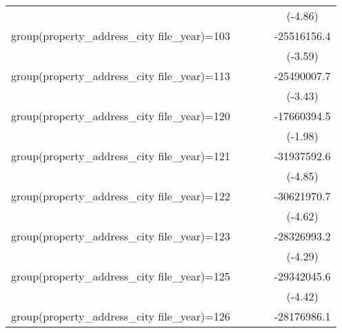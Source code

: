 {\begin{tabular}{l*{4}{c}}
                    &                     &                     &                     &     (-4.86)         \\
\addlinespace
group(property\_address\_city file\_year)=103&                     &                     &                     & -25516156.4\sym{***}\\
                    &                     &                     &                     &     (-3.59)         \\
\addlinespace
group(property\_address\_city file\_year)=113&                     &                     &                     & -25490007.7\sym{***}\\
                    &                     &                     &                     &     (-3.43)         \\
\addlinespace
group(property\_address\_city file\_year)=120&                     &                     &                     & -17660394.5\sym{*}  \\
                    &                     &                     &                     &     (-1.98)         \\
\addlinespace
group(property\_address\_city file\_year)=121&                     &                     &                     & -31937592.6\sym{***}\\
                    &                     &                     &                     &     (-4.85)         \\
\addlinespace
group(property\_address\_city file\_year)=122&                     &                     &                     & -30621970.7\sym{***}\\
                    &                     &                     &                     &     (-4.62)         \\
\addlinespace
group(property\_address\_city file\_year)=123&                     &                     &                     & -28326993.2\sym{***}\\
                    &                     &                     &                     &     (-4.29)         \\
\addlinespace
group(property\_address\_city file\_year)=125&                     &                     &                     & -29342045.6\sym{***}\\
                    &                     &                     &                     &     (-4.42)         \\
\addlinespace
group(property\_address\_city file\_year)=126&                     &                     &                     & -28176986.1\sym{***}\\

\end{tabular}}
